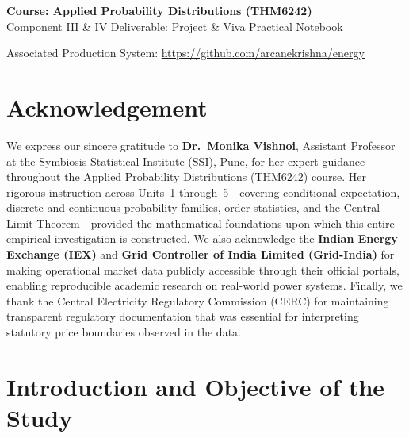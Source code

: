 \documentclass[12pt, a4paper]{article}
\theoremstyle{definition}
\begin{document}
\begin{titlepage}
    \vspace{0.65cm}

    {\large\textbf{Course: Applied Probability Distributions (THM6242)}}\\[0.15cm]
    {\large Component III \& IV Deliverable: Project \& Viva Practical Notebook}

    \vspace{0.5cm}

    {\small Associated Production System: \url{https://github.com/arcanekrishna/energy}}

\end{titlepage}

\section*{Acknowledgement}

We express our sincere gratitude to \textbf{Dr.~Monika Vishnoi}, Assistant Professor at the Symbiosis Statistical Institute (SSI), Pune, for her expert guidance throughout the Applied Probability Distributions (THM6242) course. Her rigorous instruction across Units~1 through~5---covering conditional expectation, discrete and continuous probability families, order statistics, and the Central Limit Theorem---provided the mathematical foundations upon which this entire empirical investigation is constructed. We also acknowledge the \textbf{Indian Energy Exchange (IEX)} and \textbf{Grid Controller of India Limited (Grid-India)} for making operational market data publicly accessible through their official portals, enabling reproducible academic research on real-world power systems. Finally, we thank the Central Electricity Regulatory Commission (CERC) for maintaining transparent regulatory documentation that was essential for interpreting statutory price boundaries observed in the data.

\newpage
\tableofcontents
\newpage

\section{Introduction and Objective of the Study}
\end{document}
